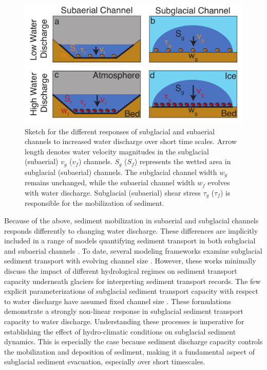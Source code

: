 \documentclass[esurf, manuscript]{copernicus}
\begin{document}
\begin{figure}[hbt!]
  \centering
  \includegraphics[width=0.8\linewidth]{Fig1.pdf}
  \caption{Sketch for the different responses of subglacial and subaerial channels to increased water discharge over short time scales.
    Arrow length denotes water velocity magnitudes in the subglacial (subaerial) $v_g$ ($v_f$) channels.
    $S_g$ ($S_f$) represents the wetted area in subglacial (subaerial) channels.
    The subglacial channel width $w_g$ remains unchanged, while the subaerial channel width $w_f$ evolves with water discharge.
    Subglacial (subaerial) shear stress $\tau_g$ ($\tau_f$) is responsible for the mobilization of sediment.
  }
  \label{fig:cartoon}
\end{figure}

Because of the above, sediment mobilization in subaerial and subglacial channels responds differently to changing water discharge.
These differences are implicitly included in a range of models quantifying sediment transport in both subglacial and subaerial channels  \citep[e.g.][]{walder1994,alley1997,tucker1997,creyts2013,beaud2018,delaney2019,hewitt2019,wickert2019}.
To date, several modeling frameworks examine subglacial sediment transport with evolving channel size \citep{creyts2013,beaud2018,delaney2019,hewitt2019}.
However, these works minimally discuss the impact of different hydrological regimes on sediment transport capacity underneath glaciers for interpreting sediment transport records.
The few explicit parameterizations of subglacial sediment transport capacity with respect to water discharge have assumed fixed channel size  \citep{alley1997}. 
These formulations demonstrate a strongly non-linear response in subglacial sediment transport capacity to water discharge.
Understanding these processes is imperative for establishing the effect of hydro-climatic conditions on subglacial sediment dynamics.
This is especially the case because sediment discharge capacity controls the mobilization and deposition of sediment, making it a fundamental aspect of subglacial sediment evacuation, especially over short timescales.
\end{document}
